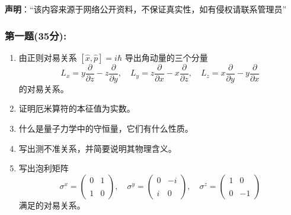 
\textbf{声明}：“该内容来源于网络公开资料，不保证真实性，如有侵权请联系管理员”

\subsubsection{第一题(35分):}
\begin{enumerate}
    \item 由正则对易关系 $[\hat{x}, \hat{p}] = i\hbar$ 导出角动量的三个分量
    \[    L_x = y \frac{\partial}{\partial z} - z \frac{\partial}{\partial y}, \quad L_y = z \frac{\partial}{\partial x} - x \frac{\partial}{\partial z}, \quad L_z = x \frac{\partial}{\partial y} - y \frac{\partial}{\partial x}~\]
    的对易关系。
    
    \item 证明厄米算符的本征值为实数。
    
    \item 什么是量子力学中的守恒量，它们有什么性质。
    
    \item 写出测不准关系，并简要说明其物理含义。
    
    \item 写出泡利矩阵
    \[    \sigma^x =     \begin{pmatrix}    0 & 1 \\\\    1 & 0    \end{pmatrix},    \quad    \sigma^y =     \begin{pmatrix}    0 & -i \\\\    i & 0    \end{pmatrix},    \quad    \sigma^z =     \begin{pmatrix}    1 & 0 \\\\    0 & -1    \end{pmatrix} ~\]
    满足的对易关系。
\end{enumerate}